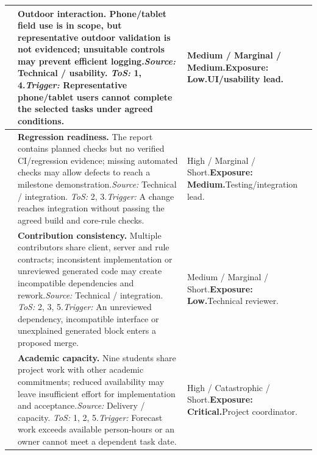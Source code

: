 {\begin{longtable}{L{0.11}L{0.62}L{0.27}}
\midrule
{}\label{risk:RS-03} & \textbf{Outdoor interaction.} Phone/tablet field use is in scope, but representative outdoor validation is not evidenced; unsuitable controls may prevent efficient logging.\newline\textit{Source:} Technical / usability. \textit{ToS:} 1, 4.\newline\textit{Trigger:} Representative phone/tablet users cannot complete the selected tasks under agreed conditions. & Medium / Marginal / Medium.\newline\textbf{Exposure: Low.}\newline UI/usability lead.\\
\midrule
{}\label{risk:RS-04} & \textbf{Regression readiness.} The report contains planned checks but no verified CI/regression evidence; missing automated checks may allow defects to reach a milestone demonstration.\newline\textit{Source:} Technical / integration. \textit{ToS:} 2, 3.\newline\textit{Trigger:} A change reaches integration without passing the agreed build and core-rule checks. & High / Marginal / Short.\newline\textbf{Exposure: Medium.}\newline Testing/integration lead.\\
\midrule
{}\label{risk:RS-05} & \textbf{Contribution consistency.} Multiple contributors share client, server and rule contracts; inconsistent implementation or unreviewed generated code may create incompatible dependencies and rework.\newline\textit{Source:} Technical / integration. \textit{ToS:} 2, 3, 5.\newline\textit{Trigger:} An unreviewed dependency, incompatible interface or unexplained generated block enters a proposed merge. & Medium / Marginal / Short.\newline\textbf{Exposure: Low.}\newline Technical reviewer.\\
\midrule
{}\label{risk:RS-06} & \textbf{Academic capacity.} Nine students share project work with other academic commitments; reduced availability may leave insufficient effort for implementation and acceptance.\newline\textit{Source:} Delivery / capacity. \textit{ToS:} 1, 2, 5.\newline\textit{Trigger:} Forecast work exceeds available person-hours or an owner cannot meet a dependent task date. & High / Catastrophic / Short.\newline\textbf{Exposure: Critical.}\newline Project coordinator.\\

\end{longtable}}
